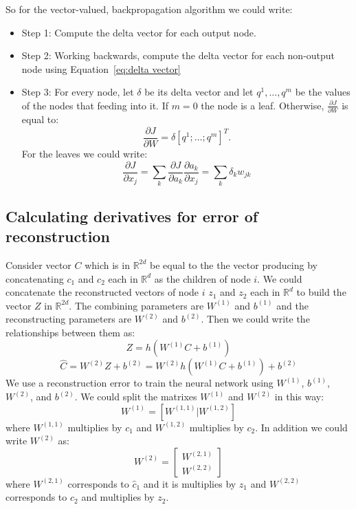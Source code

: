 \documentclass[twoside,12pt]{article}
\begin{document}
So for the vector-valued, backpropagation algorithm we could write:
\begin{itemize}
\item Step 1: Compute the delta vector for each output node.
\item Step 2: Working backwards, compute the delta vector for each non-output node using Equation~\ref{eq:delta vector}
\item Step 3: For every node, let $\delta$ be its delta vector and let $q^1,\ldots,q^m$ be the values of the nodes that feeding into it. If $m=0$ the node is a leaf. Otherwise, $\frac{\partial J}{\partial W}$ is equal to:
\begin{equation}
\frac{\partial J}{\partial W}=\delta [q^1;\ldots;q^m]^T.
\end{equation}
For the leaves we could write:
\begin{equation}
\frac{\partial J}{\partial x_j}=\sum_k \frac{\partial J}{\partial a_k}\frac{\partial a_k}{\partial x_j}=\sum_k \delta_k w_{jk}
\end{equation}
\end{itemize}
\subsection{Calculating derivatives for error of reconstruction}
Consider vector $C$ which is in $\mathbb{R}^{2d}$ be equal to the the vector producing by concatenating $c_1$ and $c_2$ each in $\mathbb{R}^d$ as the children of node $i$. We could concatenate the reconstructed vectors of node $i$ $z_1$ and $z_2$ each in $\mathbb{R}^d$ to build the vector $Z$ in $\mathbb{R}^{2d}$. The combining parameters are $W^{(1)}$ and $b^{(1)}$ and the reconstructing parameters are $W^{(2)}$ and $b^{(2)}$. Then we could write the relationships between them as:
\begin{equation}
Z = h(W^{(1)}C+b^{(1)})
\end{equation}
\begin{equation}
\hat{C}=W^{(2)}Z+b^{(2)}=W^{(2)}h(W^{(1)}C+b^{(1)})+b^{(2)}
\end{equation}
We use a reconstruction error to train the neural network using $W^{(1)}$, $b^{(1)}$, $W^{(2)}$, and $b^{(2)}$. We could split the matrixes $W^{(1)}$ and $W^{(2)}$ in this way:
\begin{equation}
W^{(1)}=[W^{(1,1)}|W^{(1,2)}]
\end{equation}
where $W^{(1,1)}$ multiplies by $c_1$ and $W^{(1,2)}$ multiplies by $c_2$. In addition we could write $W^{(2)}$ as:
\begin{equation}
W^{(2)}=\begin{bmatrix}
     W^{(2,1)} \\ \hline
     W^{(2,2)}
    \end{bmatrix}
\end{equation} 
where $W^{(2,1)}$ corresponds to $\hat{c}_1$ and it is multiplies by $z_1$ and $W^{(2,2)}$ corresponds to $\hat{c}_2$ and multiplies by $z_2$.
\end{document}
